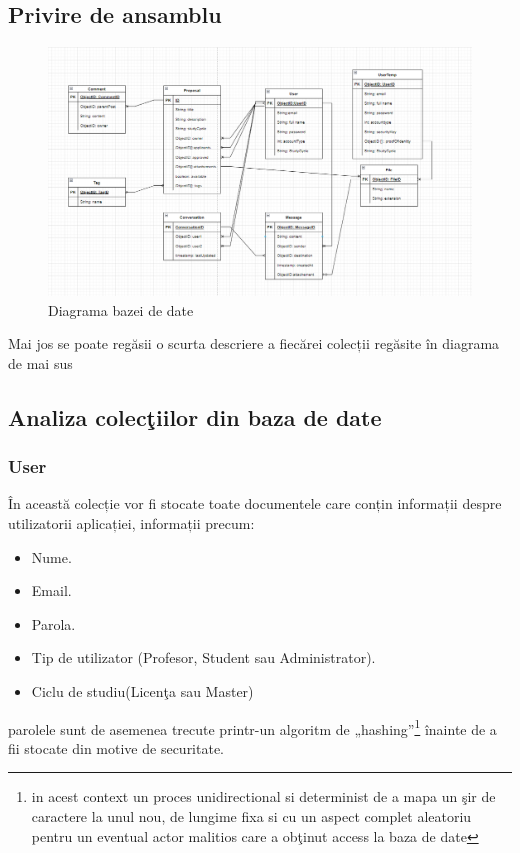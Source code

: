 \documentclass[12pt,a4paper,hidelinks]{report}
\theoremstyle{definition}
\theoremstyle{remark}
\begin{document}
\subsection{Privire de ansamblu}
\begin{figure}[H]
    \centering
    \includegraphics[scale=0.4]{images/DB_Diagram.png}
    \caption{Diagrama bazei de date}
    \label{fig:dbDiagram}
\end{figure}
Mai jos se poate regăsii o scurta descriere a fiecărei colecții regăsite în diagrama de mai sus
\subsection{Analiza colec\c tiilor din baza de date}
\subsubsection{User}
În această colecție vor fi stocate toate documentele care conțin informații despre utilizatorii aplicației, informații precum:
\begin{itemize}
    \item Nume.
    \item Email.
    \item Parola.
    \item Tip de utilizator (Profesor, Student sau Administrator).
    \item Ciclu de studiu(Licen\c ta sau Master)    
\end{itemize}
parolele sunt de asemenea trecute printr-un algoritm de „hashing”\footnote[1]{ in acest context un proces unidirectional si determinist de a mapa un \c sir de caractere la unul nou, de lungime fixa si cu un aspect complet aleatoriu pentru un eventual actor malitios care a ob\c tinut access la baza de date} înainte de a fii stocate din motive de securitate.
\end{document}
